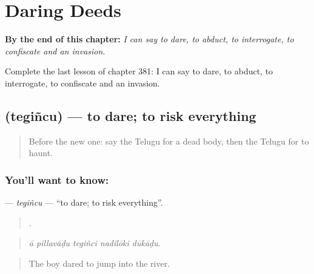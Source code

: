 
\chapter{Daring Deeds}
\label{ch:te-daring-deeds}

\begin{chapteropening}
\textbf{By the end of this chapter:} \emph{I can say to dare, to abduct, to interrogate, to confiscate and an invasion.}

Complete the last lesson of chapter 381: I can say to dare, to abduct, to interrogate, to confiscate and an invasion.
\end{chapteropening}

\section[\texorpdfstring{\te{తెగించు} (tegiñcu)}{తెగించు (tegiñcu)}]{ (tegiñcu) — to dare; to risk everything}

\label{lesson:TE-C381-tegincu}



\begin{quote}
Before the new one: say the Telugu for a dead body, then the Telugu for to haunt.
\end{quote}

\subsection*{You'll want to know: }
\textbf{} — \emph{tegiñcu} — \textquotedblleft{}to dare; to risk everything\textquotedblright{}.

\begin{quote}
    .
\end{quote}

\begin{quote}
\emph{ā pillavāḍu tegiñci nadilōki dūkāḍu.}
\end{quote}

\begin{quote}
The boy dared to jump into the river.
\end{quote}

